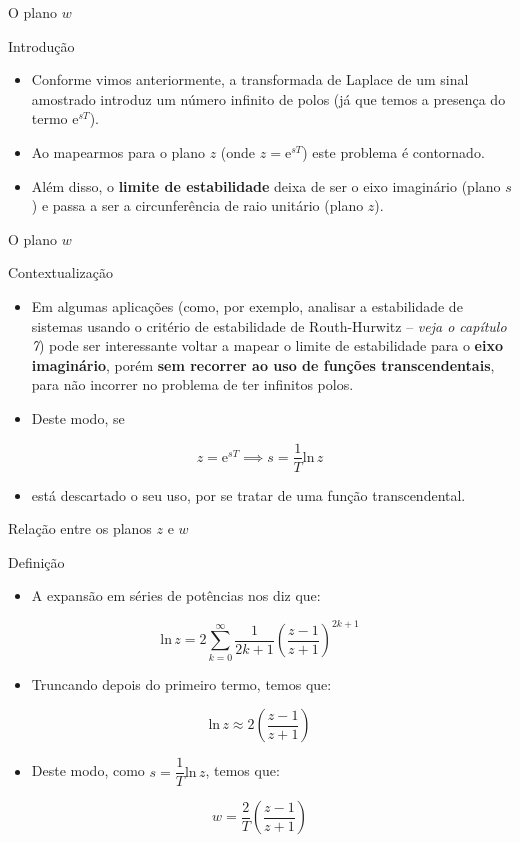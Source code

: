 \begin{frame}{O plano $w$}
\begin{block}{Introdução}
\begin{itemize}
    \item Conforme vimos anteriormente, a transformada de Laplace de um sinal amostrado introduz um número infinito de polos (já que temos a presença do termo $\text{e}^{sT}$).
    \item Ao mapearmos para o plano $z$ (onde $z = \text{e}^{sT}$) este problema é contornado.
    \item Além disso, o \textbf{limite de estabilidade} deixa de ser o eixo imaginário (plano $s$) e passa a ser a circunferência de raio unitário (plano $z$). 
\end{itemize}
\end{block}
\end{frame}

\begin{frame}{O plano $w$}
\begin{block}{Contextualização}
\begin{itemize}
    \item Em algumas aplicações (como, por exemplo, analisar a estabilidade de sistemas usando o critério de estabilidade de Routh-Hurwitz -- \textit{veja o capítulo 7}) pode ser interessante voltar a mapear o limite de estabilidade para o \textbf{eixo imaginário}, porém \textbf{sem recorrer ao uso de funções transcendentais}, para não incorrer  no problema de ter infinitos polos.
    \item Deste modo, se
\end{itemize}
$$z = \text{e}^{sT} \implies s = \dfrac{1}{T} \text{ln} \, z$$
\begin{itemize}
   \item[] está descartado o seu uso, por se tratar de uma função transcendental.
\end{itemize}
\end{block}
\end{frame}

\begin{frame}{Relação entre os planos $z$ e $w$}
\begin{block}{Definição}
\begin{itemize}
    \item A expansão em séries de potências nos diz que:
\end{itemize}
$$\text{ln} \, z = 2 \sum_{k=0}^{\infty} \dfrac{1}{2k+1} \left(\dfrac{z-1}{z+1}\right)^{2k+1}$$
\begin{itemize}
    \item Truncando depois do primeiro termo, temos que:
\end{itemize}
$$\text{ln} \, z \approx 2 \left(\dfrac{z-1}{z+1}\right)$$
\begin{itemize}
    \item Deste modo, como $s = \dfrac{1}{T} \text{ln} \, z$, temos que:
\end{itemize}
$$\boxed{w = \dfrac{2}{T} \left(\dfrac{z-1}{z+1}\right)}$$
\end{block}
\end{frame}

